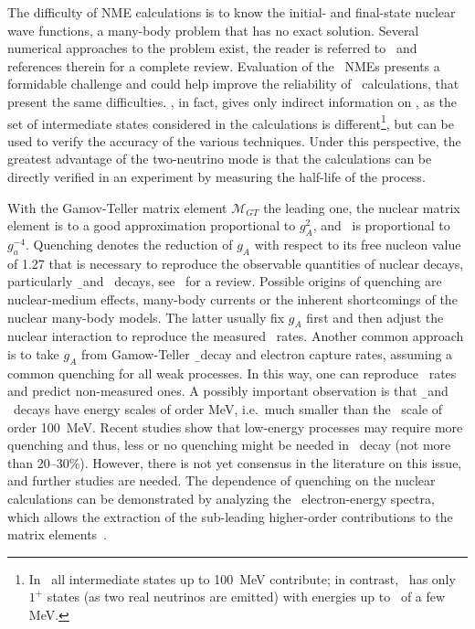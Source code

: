 The difficulty of NME calculations is to know the initial- and final-state
nuclear wave functions, a many-body problem that has no exact solution. Several
numerical approaches to the problem exist, the reader is referred
to~\cite{Engel2017} and references therein for a complete review. Evaluation of
the \nnbb\ NMEs presents a formidable challenge and could help improve the
reliability of \nmez\ calculations, that present the same difficulties. \nnbb,
in fact, gives only indirect information on \onbb, as the set of intermediate
states considered in the calculations is different\footnote{In \onbb\ all
intermediate states up to 100~MeV contribute; in contrast, \nnbb\ has only
$1^+$ states (as two real neutrinos are emitted) with energies up to \qbb\ of
a few MeV.}, but can be used to verify the accuracy of the various techniques.
Under this perspective, the greatest advantage of the two-neutrino mode is that
the calculations can be directly verified in an experiment by measuring the
half-life of the process.

With the Gamov-Teller matrix element $\mathcal{M}_{GT}$ the leading one, the
nuclear matrix element is to a good approximation proportional to $g_A^2$, and
\thalftwo\ is proportional to $g_a^{-4}$. Quenching denotes the reduction of
$g_A$ with respect to its free nucleon value of 1.27 that is necessary to
reproduce the observable quantities of nuclear decays, particularly \b\ and
\nnbb\ decays, see~\cite{Suhonen2017} for a review.  Possible origins of
quenching are nuclear-medium effects, many-body currents or the inherent
shortcomings of the nuclear many-body models. The latter usually fix $g_A$
first and then adjust the nuclear interaction to reproduce the measured \nnbb\
rates. Another common approach is to take $g_A$ from Gamow-Teller \b\ decay and
electron capture rates, assuming a common quenching for all weak processes. In
this way, one can reproduce \nnbb\ rates and predict non-measured ones. A
possibly important observation is that \b\ and \nnbb\ decays have energy scales
of order MeV, i.e.~much smaller than the \onbb\ scale of order 100~MeV. Recent
studies show that low-energy processes may require more quenching and thus,
less or no quenching might be needed in \onbb\ decay (not more than 20--30\%).
However, there is not yet consensus in the literature on this issue, and
further studies are needed. The dependence of quenching on the nuclear
calculations can be demonstrated by analyzing the \nnbb\ electron-energy
spectra, which allows the extraction of the sub-leading higher-order
contributions to the matrix elements~\cite{Gando2019}.

